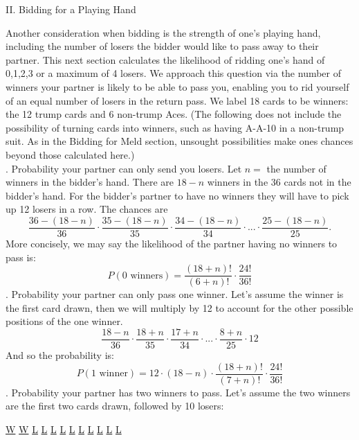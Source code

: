 \documentclass[11pt]{article}
\begin{document}
\begin{center}
 II. Bidding for a Playing Hand
\end{center}
\indent
Another consideration when bidding is the strength of one's playing hand, including the number of losers the bidder would like to pass away to their partner. This next section calculates the likelihood of ridding one's hand of 0,1,2,3 or a maximum of 4 losers. We approach this question via the number of winners your partner is likely to be able to pass you, enabling you to rid yourself of an equal number of losers in the return pass. We label 18 cards to be winners: the 12 trump cards and 6 non-trump Aces. (The following does not include the possibility of turning cards into winners, such as having A-A-10 in a non-trump suit. As in the Bidding for Meld section, unsought  possibilities make ones chances beyond those calculated here.)\\
. Probability your partner can only send you losers. Let $n=$ the number of winners in the bidder's hand. There are $18-n$ winners in the 36 cards not in the bidder's hand. For the bidder's partner to have no winners they will have to pick up 12 losers in a row. The chances are
\begin{equation}
  \frac{36-(18-n)}{36} \cdot \frac{35-(18-n)}{35}\cdot \frac{34-(18-n)}{34}\cdot ...\cdot \frac{25-(18-n)}{25}.
\end{equation}
More concisely, we may say the likelihood of the partner having no winners to pass is:
\begin{equation}
 P(0\text{ winners})= \frac{(18+n)!}{(6+n)!}\cdot \frac{24!}{36!}
\end{equation}
. Probability your partner can only pass one winner. Let's assume the winner is the first card drawn, then we will multiply by 12 to account for the other possible positions of the one winner.
\begin{equation}
\frac{18-n}{36}\cdot \frac{18+n}{35}\cdot \frac {17+n}{34}\cdot ...\cdot \frac{8+n}{25} \cdot 12
\end {equation}
And so the probability is:
\begin{equation}
 P(1 \text{ winner})= 12\cdot (18-n)\cdot \frac{(18+n)!}{(7+n)!}\cdot \frac{24!}{36!}
\end{equation}
. Probability your partner has two winners to pass. Let's assume the two winners are the first two cards drawn, followed by 10 losers:\\
\begin {center}
\underline{W} \underline{W} \underline{L} \underline{L} \underline{L} \underline{L} \underline{L} \underline{L} \underline{L} \underline{L} \underline{L} \underline{L}
\end {center}
\end{document}
